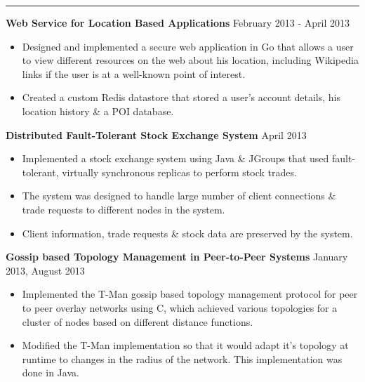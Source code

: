 \documentclass[10pt, a4paper]{article}
\begin{document}
\smallskip
\hrule
{\bf Web Service for Location Based Applications} \hfill February 2013 - April 2013
\begin{itemize}
    \item Designed and implemented a secure web application in Go that allows a user to view different resources on the web about his location, including Wikipedia links if the user is at a well-known point of interest.
    \item Created a custom Redis datastore that stored a user's account details, his location history \& a POI database.
\end{itemize}

{\bf Distributed Fault-Tolerant Stock Exchange System} \hfill April 2013
\begin{itemize}
    \item Implemented a stock exchange system using Java \& JGroups that used fault-tolerant, virtually synchronous replicas to perform stock trades.
    \item The system was designed to handle large number of client connections \& trade requests to different nodes in the system.
    \item Client information, trade requests \& stock data are preserved by the system. %
\end{itemize}
{\bf Gossip based Topology Management in Peer-to-Peer Systems} \hfill January 2013, August 2013
\begin{itemize}
    \item Implemented the T-Man gossip based topology management protocol for peer to peer overlay networks using C, which achieved various topologies for a cluster of nodes based on different distance functions.
    \item Modified the T-Man implementation so that it would adapt it's topology at runtime to changes in the radius of the network. This implementation was done in Java. %
\end{itemize}
\end{document}
